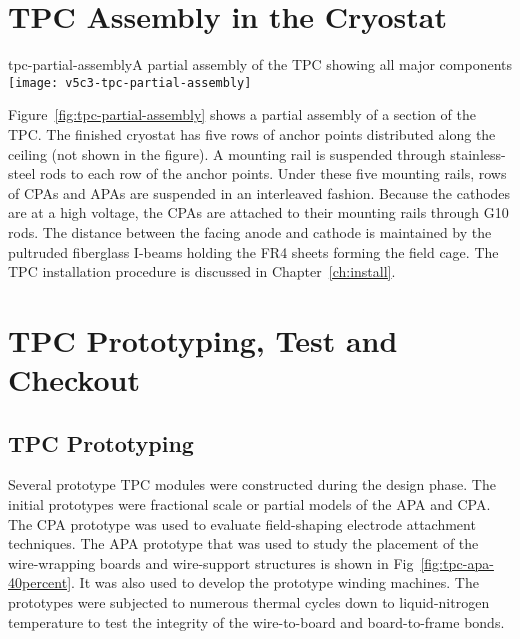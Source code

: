 \section{TPC Assembly in the Cryostat}


\begin{cdrfigure}{tpc-partial-assembly}{A partial assembly of the TPC showing all major components}
\texttt{[image: v5c3-tpc-partial-assembly]}
\end{cdrfigure}


Figure~\ref{fig:tpc-partial-assembly} shows a partial assembly of a section of the TPC. The finished cryostat has five rows of anchor points distributed along the ceiling (not shown in the figure). A mounting rail is suspended through stainless-steel rods to each row of the anchor points. Under these five mounting rails, rows of CPAs and APAs are suspended in an interleaved fashion. Because the cathodes are at a high voltage, the CPAs are attached to their mounting rails through G10 rods. The distance between the facing anode and cathode is maintained by the pultruded fiberglass I-beams holding the FR4 sheets forming the field cage. The TPC installation procedure is discussed in  Chapter~\ref{ch:install}.




\section{TPC Prototyping, Test and  Checkout}
\label{sec:v5-tpc-checkout}

\subsection{TPC Prototyping}
\label{sec:v5-tpc-checkout-prototype}

Several prototype TPC modules were constructed during the design phase. The initial prototypes were fractional scale or partial models of the APA and CPA. The CPA prototype was used to evaluate field-shaping electrode attachment techniques. The APA prototype that was used to study the placement of the wire-wrapping boards and wire-support structures is shown in Fig~\ref{fig:tpc-apa-40percent}. It was also used to develop the prototype winding machines. The prototypes were subjected to numerous thermal cycles down to liquid-nitrogen temperature to test the integrity of the wire-to-board and board-to-frame bonds. 


